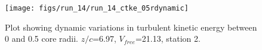 \begin{figure}[H]
\centering
\texttt{[image: figs/run\_14/run\_14\_ctke\_05rdynamic]}
\caption{Plot showing dynamic variations in turbulent kinetic energy between 0 and 0.5 core radii. $z/c$=6.97, $V_{free}$=21.13, station 2.}
\label{fig:run_14_ctke_05rdynamic}
\end{figure}


